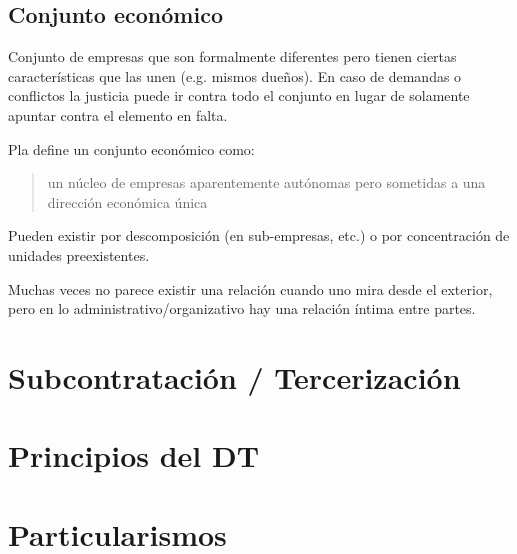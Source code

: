 \documentclass[../main.tex]{subfiles}
\begin{document}
\subsection{Conjunto económico}

Conjunto de empresas que son formalmente diferentes pero tienen ciertas características que las unen (e.g. mismos dueños).
En caso de demandas o conflictos la justicia puede ir contra todo el conjunto en lugar de solamente apuntar contra el elemento en falta.

Pla define un conjunto económico como: \blockquote{un núcleo de empresas aparentemente autónomas pero sometidas a una dirección económica única}

Pueden existir por descomposición (en sub-empresas, etc.) o por concentración de unidades preexistentes.

Muchas veces no parece existir una relación cuando uno mira desde el exterior, pero en lo administrativo/organizativo hay una relación íntima entre partes.

\section{Subcontratación / Tercerización}

\section{Principios del DT}

\section{Particularismos}
\end{document}
